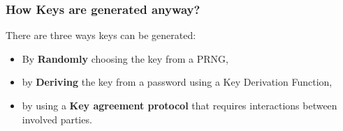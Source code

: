 \begin{frame}
        \frametitle{How Keys are generated anyway?}
        There are three ways keys can be generated:
        \begin{itemize}
          \item By {\bf Randomly} choosing the key from a PRNG,
          \item by {\bf Deriving} the key from a password using a Key Derivation Function,
          \item by using a {\bf Key agreement protocol} that requires
            interactions between involved parties.
        \end{itemize}
\end{frame}